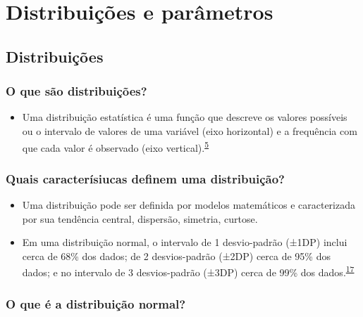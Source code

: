 \documentclass[
]{book}
\providecommand{\tightlist}{%
  \setlength{\itemsep}{0pt}\setlength{\parskip}{0pt}}
\begin{document}
\hypertarget{distribuicoes-parametros}{%
\chapter{\texorpdfstring{\textbf{Distribuições e parâmetros}}{Distribuições e parâmetros}}\label{distribuicoes-parametros}}

\hypertarget{distribuicoes}{%
\section{Distribuições}\label{distribuicoes}}

\hypertarget{o-que-suxe3o-distribuiuxe7uxf5es}{%
\subsection{O que são distribuições?}\label{o-que-suxe3o-distribuiuxe7uxf5es}}

\begin{itemize}
\tightlist
\item
  Uma distribuição estatística é uma função que descreve os valores possíveis ou o intervalo de valores de uma variável (eixo horizontal) e a frequência com que cada valor é observado (eixo vertical).\textsuperscript{\protect\hyperlink{ref-vetter2017}{5}}
\end{itemize}

\hypertarget{quais-caracteruxedsiucas-definem-uma-distribuiuxe7uxe3o}{%
\subsection{Quais caracterísiucas definem uma distribuição?}\label{quais-caracteruxedsiucas-definem-uma-distribuiuxe7uxe3o}}

\begin{itemize}
\item
  Uma distribuição pode ser definida por modelos matemáticos e caracterizada por sua tendência central, dispersão, simetria, curtose.
\item
  Em uma distribuição normal, o intervalo de 1 desvio-padrão (±1DP) inclui cerca de 68\% dos dados; de 2 desvios-padrão (±2DP) cerca de 95\% dos dados; e no intervalo de 3 desvios-padrão (±3DP) cerca de 99\% dos dados.\textsuperscript{\protect\hyperlink{ref-Ali2016}{17}}
\end{itemize}

\hypertarget{o-que-uxe9-a-distribuiuxe7uxe3o-normal}{%
\subsection{O que é a distribuição normal?}\label{o-que-uxe9-a-distribuiuxe7uxe3o-normal}}
\end{document}
